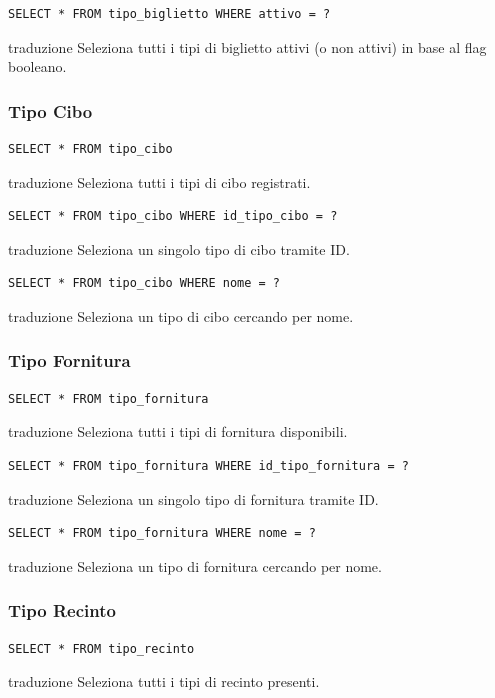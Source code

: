 \documentclass[12pt,a4paper]{report}
\begin{document}
\begin{lstlisting}[style=sqlstyle]
SELECT * FROM tipo_biglietto WHERE attivo = ?
\end{lstlisting}
traduzione {Seleziona tutti i tipi di biglietto attivi (o non attivi) in base al flag booleano.}

\subsubsection*{Tipo Cibo}
\begin{lstlisting}[style=sqlstyle]
SELECT * FROM tipo_cibo
\end{lstlisting}
traduzione {Seleziona tutti i tipi di cibo registrati.}

\begin{lstlisting}[style=sqlstyle]
SELECT * FROM tipo_cibo WHERE id_tipo_cibo = ?
\end{lstlisting}
traduzione {Seleziona un singolo tipo di cibo tramite ID.}

\begin{lstlisting}[style=sqlstyle]
SELECT * FROM tipo_cibo WHERE nome = ?
\end{lstlisting}
traduzione {Seleziona un tipo di cibo cercando per nome.}

\subsubsection*{Tipo Fornitura}
\begin{lstlisting}[style=sqlstyle]
SELECT * FROM tipo_fornitura
\end{lstlisting}
traduzione {Seleziona tutti i tipi di fornitura disponibili.}

\begin{lstlisting}[style=sqlstyle]
SELECT * FROM tipo_fornitura WHERE id_tipo_fornitura = ?
\end{lstlisting}
traduzione {Seleziona un singolo tipo di fornitura tramite ID.}

\begin{lstlisting}[style=sqlstyle]
SELECT * FROM tipo_fornitura WHERE nome = ?
\end{lstlisting}
traduzione {Seleziona un tipo di fornitura cercando per nome.}

\subsubsection*{Tipo Recinto}
\begin{lstlisting}[style=sqlstyle]
SELECT * FROM tipo_recinto
\end{lstlisting}
traduzione {Seleziona tutti i tipi di recinto presenti.}
\end{document}
